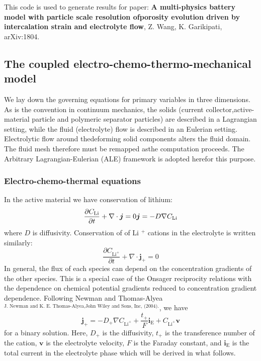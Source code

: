 This code is used to generate results for paper\+: {\bfseries{A multi-\/physics battery model with particle scale resolution ofporosity evolution driven by intercalation strain and electrolyte flow}}, Z. Wang, K. Garikipati, ar\+Xiv\+:1804.  \hypertarget{battery_particle_section1}{}\subsection{The coupled electro-\/chemo-\/thermo-\/mechanical model}\label{battery_particle_section1}
We lay down the governing equations for primary variables in three dimensions. As is the convention in continuum mechanics, the solids (current collector,active-\/material particle and polymeric separator particles) are described in a Lagrangian setting, while the fluid (electrolyte) flow is described in an Eulerian setting. Electrolytic flow around thedeforming solid components alters the fluid domain. The fluid mesh therefore must be remapped asthe computation proceeds. The Arbitrary Lagrangian-\/\+Eulerian (A\+LE) framework is adopted herefor this purpose. \hypertarget{battery_particle_subsub1}{}\subsubsection{Electro-\/chemo-\/thermal equations}\label{battery_particle_subsub1}
In the active material we have conservation of lithium\+: \[ \frac{\partial C_\text{Li}}{\partial t}+\nabla\cdot\boldsymbol{j}=0\\ \boldsymbol{j}=-D\nabla C_\text{Li} \] where $D$ is diffusivity. Conservation of of Li $^+$ cations in the electrolyte is written similarly\+: \[ \frac{\partial C_{\text{Li}^+}}{\partial t}+\nabla\cdot\boldsymbol{j}_+=0 \] In general, the flux of each species can depend on the concentration gradients of the other species. This is a special case of the Onsager reciprocity relations with the dependence on chemical potential gradients reduced to concentration gradient dependence. Following Newman and Thomas-\/\+Alyea $^{\text{J. Newman and K. E. Thomas-Alyea,John Wiley and Sons, Inc, (2004).}}$, we have \[ \boldsymbol{j}_+=-D_{+}\nabla C_{\text{Li}^+} +\frac{t_+}{F}\boldsymbol{i}_\text{E}+C_{\text{Li}^+}\boldsymbol{v} \] for a binary solution. Here, $D_{+}$ is the diffusivity, $t_+$ is the transference number of the cation, $\boldsymbol{v}$ is the electrolyte velocity, $F$ is the Faraday constant, and $\boldsymbol{i}_\text{E}$ is the total current in the electrolyte phase which will be derived in what follows.

